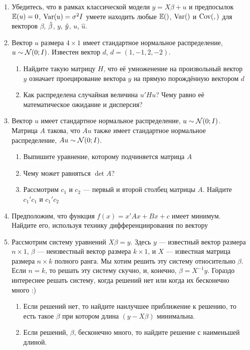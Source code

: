 \documentclass[12pt, a4paper]{article}
\begin{document}
\begin{enumerate}

\item Убедитесь, что в рамках классической модели $y=X\beta + u$ и предпосылок $\mathbb{E}(u) = 0$, $\operatorname{Var}(u) = \sigma^2 I$  умеете находить любые $\mathbb{E}()$, $\operatorname{Var}()$ и $\operatorname{Cov}(,)$ для векторов $\beta$, $\hat{\beta}$, $y$, $\hat{y}$, $u$, $\hat u$.

\item Вектор $u$ размера $4 \times 1$ имеет стандартное нормальное распределение, $u \sim \mathcal{N} (0; I)$. Известен вектор $d$, $d=(1, -1, 2, -2)$.

\begin{enumerate}
  \item Найдите такую матрицу $H$, что её умноженение на произвольный вектор $y$ означает проецирование вектора $y$ на прямую порождённую вектором $d$
  \item Как распределена случайная величина $u' H u$? Чему равно её математическое ожидание и дисперсия?
\end{enumerate}

\item Вектор $u$ имеет стандартное нормальное распределение, $u \sim \mathcal{N} (0; I)$. Матрица $A$ такова, что $Au$ также имеет стандартное нормальное распределение, $Au \sim \mathcal{N}(0;I)$.
\begin{enumerate}
  \item Выпишите уравнение, которому подчиняется матрица $A$
  \item Чему может равняться $\det A$?
  \item Рассмотрим $c_1$ и $c_2$ — первый и второй столбец матрицы $A$. Найдите $c_1'c_1$ и $c_1'c_2$
\end{enumerate}

\item Предположим, что функция $f(x) = x'Ax + Bx + c$ имеет минимум. Найдите его, используя технику дифференциирования по вектору

\item Рассмотрим систему уравнений $X\beta = y$. Здесь $y$ — известный вектор размера $n\times 1$, $\beta$ — неизвестный вектор размера $k\times 1$, и $X$ — известная матрица размера $n\times k$ полного ранга. Мы хотим решить эту систему относительно $\beta$. Если $n=k$, то решать эту систему скучно, и, конечно, $\beta = X^{-1}y$. Гораздо интереснее решать систему, когда решений нет или когда их бесконечно много :)

\begin{enumerate}
\item Если решений нет, то найдите наилучшее приближение к решению, то есть такое $\beta$ при котором длина $(y-X\beta)$ минимальна.
\item Если решений, $\beta$, бесконечно много, то найдите решение с наименьшей длиной.
\end{enumerate}


\end{enumerate}
\end{document}
